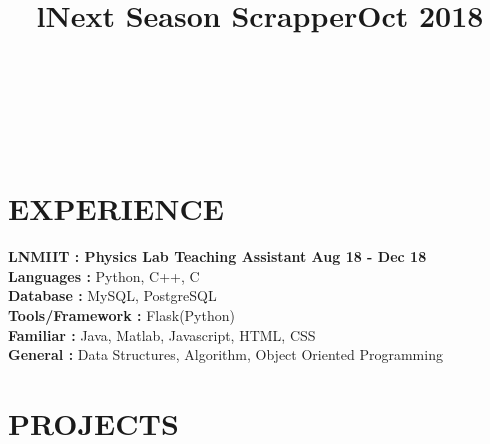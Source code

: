 \documentclass[margin]{res}
\begin{document}
\begin{resume}
\begin{format}
\title{l}\\
\\
\body\\
\end{format}

\section{EXPERIENCE}

\textbf{LNMIIT : Physics Lab Teaching Assistant \hfill{Aug 18 - Dec 18}\\}
\textbf{Languages : } Python, C++, C
\\
\textbf{Database :} MySQL, PostgreSQL
\\
\textbf{Tools/Framework : } Flask(Python)
\\
\textbf{Familiar : } Java, Matlab, Javascript, HTML, CSS
\\
\textbf{General : } Data Structures, Algorithm, Object Oriented Programming

\section{PROJECTS}
\location{}
\title{\textbf{Next Season Scrapper\hfill Oct 2018}
 }


\end{resume}
\end{document}
